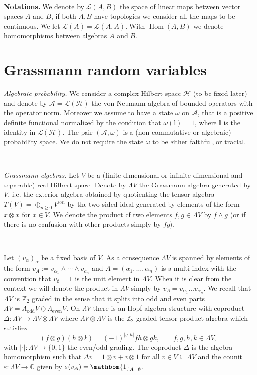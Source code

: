\documentclass{article}
\newcommand{\assign}{:=}
\newcommand{\tmop}[1]{\ensuremath{\operatorname{#1}}}
\newcommand{\tmtextbf}[1]{{\bfseries{#1}}}
\newcommand{\tmtextit}[1]{{\itshape{#1}}}
\begin{document}
\

{\noindent}\tmtextbf{Notations.} We denote by $\mathcal{L} (A, B)$ the space
of linear maps between vector spaces $A$ and $B$, if both $A, B$ have
topologies we consider all the maps to be continuous. We let $\mathcal{L} (A)
=\mathcal{L} (A, A)$. With $\tmop{Hom} (A, B)$ we denote homomorphisms between
algebras $A$ and $B$.

\section{Grassmann random variables}\label{sec:grassmann-rv}

\tmtextit{Algebraic probability.} We consider a complex Hilbert space
$\mathcal{H}$ (to be fixed later) and denote by $\mathcal{A}=\mathcal{L}
(\mathcal{H})$ the von Neumann algebra of bounded operators with the operator
norm. Moreover we assume to have a state $\omega$ on $\mathcal{A}$, that is a
positive definite functional normalized by the condition that $\omega
(\mathbb{I}) = 1$, where $\mathbb{I}$ is the identity in $\mathcal{L}
(\mathcal{H})$. The pair $(\mathcal{A}, \omega)$ is a (non-commutative or
algebraic) probability space. We do not require the state $\omega$ to be
either faithful, or tracial.

\

\tmtextit{Grassmann algebras.} Let $V$ be a (finite dimensional or infinite
dimensional and separable) real Hilbert space. Denote by $\Lambda V$ the
Grassmann algebra generated by $V$, i.e. the exterior algebra obtained by
quotienting the tensor algebra $T (V) = \oplus_{n \geqslant 0} V^{\otimes n}$
by the two-sided ideal generated by elements of the form $x \otimes x$ for $x
\in V$. We denote the product of two elements $f, g \in \Lambda V$ by $f
\wedge g$ (or if there is no confusion with other products simply by $f g$).

\

Let $(v_{\alpha})_{\alpha}$ be a fixed basis of $V$. As a consequence
$\Lambda V$ is spanned by elements of the form $v_A \assign v_{\alpha_1}
\wedge \cdots \wedge v_{\alpha_n}$ and $A = (\alpha_1, \ldots, \alpha_n)$ is a
multi-index with the convention that $v_{\emptyset} = 1$ is the unit element
in $\Lambda V$. When it is clear from the context we will denote the product
in $\Lambda V$ simply by $v_A = v_{\alpha_1} \ldots v_{\alpha_n}$. We recall
that $\Lambda V$ is $\mathbb{Z}_2$ graded in the sense that it splits into odd
and even parts $\Lambda V = \Lambda_{\tmop{odd}} V \oplus
\Lambda_{\tmop{even}} V$. On $\Lambda V$ there is an Hopf algebra structure
with coproduct $\Delta : \Lambda V \rightarrow \Lambda V \otimes \Lambda V$
where $\Lambda V \otimes \Lambda V$ is the $\mathbb{Z}_2$-graded tensor
product algebra which satisfies
\[ (f \otimes g) (h \otimes k) = (- 1)^{| g |  | h |} f h \otimes g k, \qquad
   f, g, h, k \in \Lambda V, \]
with $| \cdot | : \Lambda V \rightarrow \{ 0, 1 \}$ the even/odd grading. The
coproduct $\Delta$ is the algebra homomorphism such that $\Delta v = 1 \otimes
v + v \otimes 1$ for all $v \in V \subseteq \Lambda V$ and the counit
$\varepsilon : \Lambda V \rightarrow \mathbb{C}$ given by $\varepsilon (v_A)
=\mathbbm{1}_{A = \emptyset}$.
\end{document}
